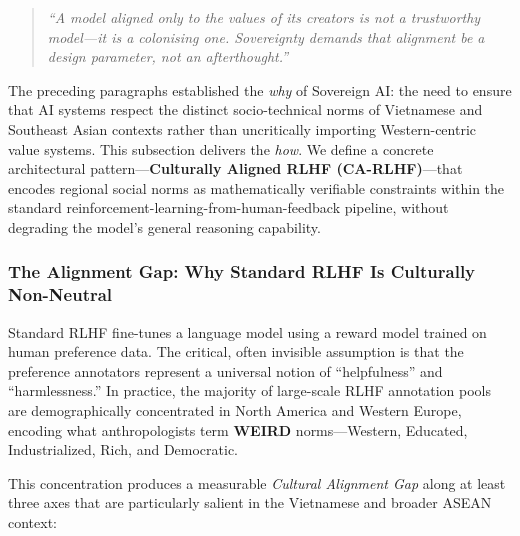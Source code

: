 \begin{quote}
\textit{``A model aligned only to the values of its creators is not
a trustworthy model---it is a colonising one. Sovereignty demands
that alignment be a design parameter, not an afterthought.''}
\end{quote}

The preceding paragraphs established the \emph{why}
of Sovereign AI: the need to ensure that AI systems respect the
distinct socio-technical norms of Vietnamese and Southeast Asian
contexts rather than uncritically importing Western-centric value
systems.
This subsection delivers the \emph{how}.
We define a concrete architectural pattern---\textbf{Culturally
Aligned RLHF (CA-RLHF)}---that encodes regional social norms as
mathematically verifiable constraints within the standard
reinforcement-learning-from-human-feedback pipeline, without
degrading the model's general reasoning capability.

\subsubsection{The Alignment Gap: Why Standard RLHF Is
               Culturally Non-Neutral}
\label{subsubsec:alignment-gap}

Standard RLHF \cite{ouyang2022} fine-tunes a language model
using a reward model trained on human preference data.
The critical, often invisible assumption is that the preference
annotators represent a universal notion of ``helpfulness'' and
``harmlessness.''
In practice, the majority of large-scale RLHF annotation pools are
demographically concentrated in North America and Western Europe,
encoding what anthropologists term \textbf{WEIRD} norms---Western,
Educated, Industrialized, Rich, and Democratic.

This concentration produces a measurable \emph{Cultural Alignment
Gap} along at least three axes that are particularly salient in the
Vietnamese and broader ASEAN context:

